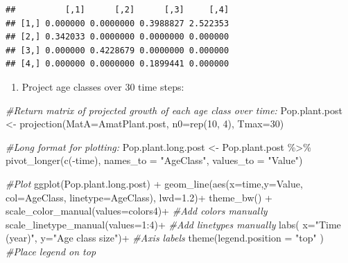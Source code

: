 \documentclass[
]{book}
\newenvironment{Shaded}{\begin{snugshade}}{\end{snugshade}}
\newcommand{\AttributeTok}[1]{\textcolor[rgb]{0.77,0.63,0.00}{#1}}
\newcommand{\CommentTok}[1]{\textcolor[rgb]{0.56,0.35,0.01}{\textit{#1}}}
\newcommand{\DecValTok}[1]{\textcolor[rgb]{0.00,0.00,0.81}{#1}}
\newcommand{\FloatTok}[1]{\textcolor[rgb]{0.00,0.00,0.81}{#1}}
\newcommand{\FunctionTok}[1]{\textcolor[rgb]{0.00,0.00,0.00}{#1}}
\newcommand{\NormalTok}[1]{#1}
\newcommand{\OtherTok}[1]{\textcolor[rgb]{0.56,0.35,0.01}{#1}}
\newcommand{\SpecialCharTok}[1]{\textcolor[rgb]{0.00,0.00,0.00}{#1}}
\newcommand{\StringTok}[1]{\textcolor[rgb]{0.31,0.60,0.02}{#1}}
\providecommand{\tightlist}{%
  \setlength{\itemsep}{0pt}\setlength{\parskip}{0pt}}
\begin{document}
\begin{verbatim}
##          [,1]      [,2]      [,3]     [,4]
## [1,] 0.000000 0.0000000 0.3988827 2.522353
## [2,] 0.342033 0.0000000 0.0000000 0.000000
## [3,] 0.000000 0.4228679 0.0000000 0.000000
## [4,] 0.000000 0.0000000 0.1899441 0.000000
\end{verbatim}

\begin{enumerate}
\def\labelenumi{\arabic{enumi}.}
\setcounter{enumi}{3}
\tightlist
\item
  Project age classes over 30 time steps:
\end{enumerate}

\begin{Shaded}
\begin{Highlighting}[]
\CommentTok{\#Return matrix of projected growth of each age class over time:}
\NormalTok{Pop.plant.post }\OtherTok{\textless{}{-}} \FunctionTok{projection}\NormalTok{(}\AttributeTok{MatA=}\NormalTok{AmatPlant.post, }\AttributeTok{n0=}\FunctionTok{rep}\NormalTok{(}\DecValTok{10}\NormalTok{, }\DecValTok{4}\NormalTok{), }\AttributeTok{Tmax=}\DecValTok{30}\NormalTok{)}
 
\CommentTok{\#Long format for plotting:}
\NormalTok{Pop.plant.long.post }\OtherTok{\textless{}{-}}\NormalTok{ Pop.plant.post }\SpecialCharTok{\%\textgreater{}\%} \FunctionTok{pivot\_longer}\NormalTok{(}\FunctionTok{c}\NormalTok{(}\SpecialCharTok{{-}}\NormalTok{time),}
               \AttributeTok{names\_to =} \StringTok{"AgeClass"}\NormalTok{, }\AttributeTok{values\_to =} \StringTok{"Value"}\NormalTok{)}

\CommentTok{\#Plot}
\FunctionTok{ggplot}\NormalTok{(Pop.plant.long.post) }\SpecialCharTok{+} 
  \FunctionTok{geom\_line}\NormalTok{(}\FunctionTok{aes}\NormalTok{(}\AttributeTok{x=}\NormalTok{time,}\AttributeTok{y=}\NormalTok{Value, }\AttributeTok{col=}\NormalTok{AgeClass, }\AttributeTok{linetype=}\NormalTok{AgeClass), }\AttributeTok{lwd=}\FloatTok{1.2}\NormalTok{)}\SpecialCharTok{+}
  \FunctionTok{theme\_bw}\NormalTok{() }\SpecialCharTok{+}
  \FunctionTok{scale\_color\_manual}\NormalTok{(}\AttributeTok{values=}\NormalTok{colors4)}\SpecialCharTok{+} \CommentTok{\#Add colors manually}
  \FunctionTok{scale\_linetype\_manual}\NormalTok{(}\AttributeTok{values=}\DecValTok{1}\SpecialCharTok{:}\DecValTok{4}\NormalTok{)}\SpecialCharTok{+} \CommentTok{\#Add linetypes manually}
  \FunctionTok{labs}\NormalTok{( }\AttributeTok{x=}\StringTok{"Time (year)"}\NormalTok{, }\AttributeTok{y=}\StringTok{"Age class size"}\NormalTok{)}\SpecialCharTok{+} \CommentTok{\#Axis labels}
  \FunctionTok{theme}\NormalTok{(}\AttributeTok{legend.position =} \StringTok{"top"}\NormalTok{ ) }\CommentTok{\#Place legend on top}
\end{Highlighting}
\end{Shaded}
\end{document}
